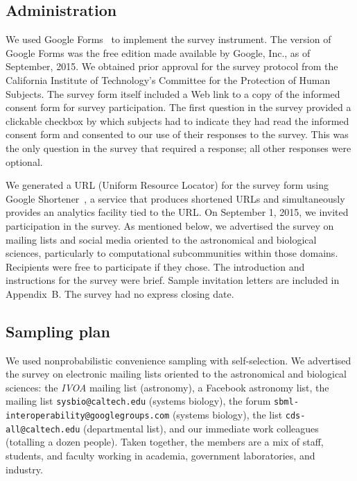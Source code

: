 \documentclass{casicswhitepaper}
\begin{document}
\subsection{Administration}

We used Google Forms~\cite{googleforms} to implement the survey instrument.  The version of Google Forms was the free edition made available by Google, Inc., as of September, 2015.  We obtained prior approval for the survey protocol from the California Institute of Technology's Committee for the Protection of Human Subjects.  The survey form itself included a Web link to a copy of the informed consent form for survey participation.  The first question in the survey provided a clickable checkbox by which subjects had to indicate they had read the informed consent form and consented to our use of their responses to the survey.  This was the only question in the survey that required a response; all other responses were optional.

We generated a URL (Uniform Resource Locator) for the survey form using Google Shortener~\cite{googl}, a service that produces shortened URLs and simultaneously provides an analytics facility tied to the URL.  On September 1, 2015, we invited participation in the survey.  As mentioned below, we advertised the survey on mailing lists and social media oriented to the astronomical and biological sciences, particularly to computational subcommunities within those domains.  Recipients were free to participate if they chose.  The introduction and instructions for the survey were brief.  Sample invitation letters are included in Appendix~B.  The survey had no express closing date.


\subsection{Sampling plan}
\label{sampling-plan}

%

\newcommand{\totalPotentialRecipients}{2300\xspace}
\newcommand{\totalClicks}{172\xspace}
\newcommand{\accessRate}{7.5\%\xspace}
\newcommand{\populationResponseRate}{3\%\xspace}
\newcommand{\completionRate}{40\%\xspace}

We used nonprobabilistic convenience sampling with self-selection.  We advertised the survey on electronic mailing lists oriented to the astronomical and biological sciences: the \emph{IVOA} mailing list (astronomy), a Facebook astronomy list, the mailing list \texttt{sysbio@caltech.edu} (systems biology), the forum \texttt{sbml-interoperability@googlegroups.com} (systems biology), the list \texttt{cds-all@caltech.edu} (departmental list), and our immediate work colleagues (totalling a dozen people).  Taken together, the members are a mix of staff, students, and faculty working in academia, government laboratories, and industry.
\end{document}
